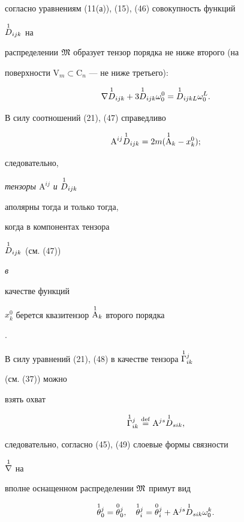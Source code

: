 согласно уравнениям (11(а)), (15), (46) совокупность функций 


$\overset{1}{D}{}_{i j k}$ на 


распределении $\frak M$ образует тензор порядка не ниже второго (на 


поверхности $\mathrm V_m\subset\mathrm C_n$ --- не ниже третьего): 


\begin{equation} 


\nabla\up{1}{D}_{i j k}+3\up{1}{D}_{i j k}\omega^0_0= 


\up{1}{D}_{i j k L}\omega^L_0. 


\end{equation} 


 


В силу соотношений (21), (47) справедливо 


$$


\mathrm A^{i j}\up{1}{D}_{i j k}=2m(\up{1}{\mathrm A}_k-x^0_k); 


$$


следовательно, {\it тензоры $\mathrm A^{i j}$ и $\overset{1}{D}{}_{i j k}$ 


аполярны тогда и только тогда, 


когда в компонентах тензора} $\overset{1}{D}{}_{i j k}$ (см. (47)) {\it в 


качестве функций 


$x^0_k$ берется квазитензор $\overset{1}{\mathrm A}{}_k$ второго порядка}. 


 


В силу уравнений (21), (48) в качестве тензора $\overset{1}{\Gamma}{}^j_{i k}$ 


(см. (37)) можно 


взять охват 


\begin{equation} 


\up{1}{\Gamma}^j_{i k}\eqdef \mathrm A^{j s}\up{1}{D}_{s i k},


\end{equation} 


следовательно, согласно (45), (49) слоевые формы связности 


$\overset{1}{\nabla}{}$ на 


вполне оснащенном распределении $\frak M$ примут вид 


\begin{equation} 


\up{1}{\theta}^j_0=\up{0}{\theta}^j_0,\quad 


\up{1}{\theta}^j_i=\up{0}{\theta}^j_i+\mathrm A^{j s} 


\up{1}{D}_{s i k}\omega^k_0. 


\end{equation} 


